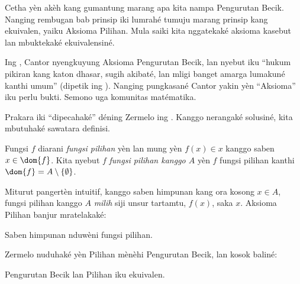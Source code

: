 \documentclass[../../../include/open-logic-section]{subfiles}
\begin{document}

Cetha yèn akèh kang gumantung marang apa kita nampa Pengurutan Becik.
Nanging rembugan bab prinsip iki lumrahé tumuju marang prinsip kang
ekuivalen, yaiku Aksioma Pilihan. Mula saiki kita nggatekaké aksioma
kasebut lan mbuktekaké ekuivalensiné.

Ing \citeyear{Cantor1883}, Cantor nyengkuyung Aksioma Pengurutan Becik,
lan nyebut iku ``hukum pikiran kang katon dhasar, sugih akibaté,
lan mligi banget amarga lumakuné kanthi umum'' (dipetik ing
\citeauthor{Potter2004} \citeyear[kaca~243]{Potter2004}). Nanging
pungkasané Cantor yakin yèn ``Aksioma'' iku perlu bukti. Semono uga
komunitas matématika.

Prakara iki ``dipecahaké'' déning Zermelo ing
\citeyear{Zermelo1904}. Kanggo nerangaké solusiné, kita
mbutuhaké sawatara definisi.

\begin{defn}
Fungsi $f$ diarani \emph{fungsi pilihan} yèn lan mung yèn
$f(x) \in x$ kanggo saben $x \in \dom{f}$. Kita nyebut $f$
\emph{fungsi pilihan kanggo $A$} yèn $f$ fungsi pilihan kanthi
$\dom{f} = A \setminus \{\emptyset\}$.
\end{defn}

Miturut pangertèn intuitif, kanggo saben himpunan kang ora kosong
$x \in A$, fungsi pilihan kanggo $A$ \emph{milih} siji unsur tartamtu,
$f(x)$, saka $x$. Aksioma Pilihan banjur mratelakaké:

\begin{axiom}[Pilihan]
	Saben himpunan nduwèni fungsi pilihan.
\end{axiom}

Zermelo nuduhaké yèn Pilihan mènèhi Pengurutan Becik, lan kosok baliné:

\begin{thm}[ing $\ZF$]
Pengurutan Becik lan Pilihan iku ekuivalen.
\end{thm}
\end{document}
